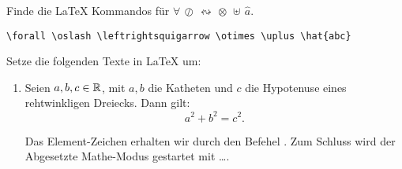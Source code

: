 \item Finde die \LaTeX{} Kommandos für $\forall\,\oslash\,\leftrightsquigarrow\,\otimes\,\uplus\,\hat{a}$.
    \begin{loesung}
        \verb|\forall \oslash \leftrightsquigarrow \otimes \uplus \hat{abc}|
    \end{loesung}

    
\item Setze die folgenden Texte in \LaTeX{} um:
    \begin{enumerate}
        \item Seien $a,b,c\in\mathbb{R}$, mit $a,b$ die Katheten und $c$ die Hypotenuse
            eines rehtwinkligen Dreiecks. Dann gilt: 
            \[
                a^2+b^2=c^2.
            \]
        \begin{loesung}
            Das Element-Zeichen erhalten wir durch den Befehel . Zum Schluss
            wird der Abgesetzte Mathe-Modus gestartet mit \cmd{[} \dots \cmd{]}.
        \end{loesung}



\end{enumerate}
